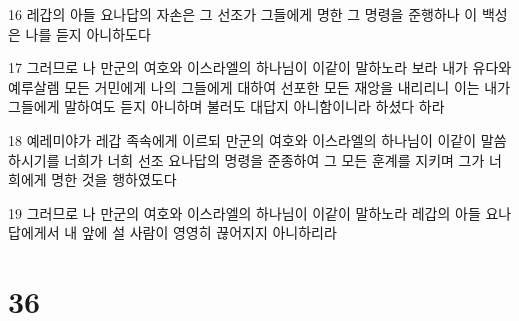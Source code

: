 \par 16 레갑의 아들 요나답의 자손은 그 선조가 그들에게 명한 그 명령을 준행하나 이 백성은 나를 듣지 아니하도다
\par 17 그러므로 나 만군의 여호와 이스라엘의 하나님이 이같이 말하노라 보라 내가 유다와 예루살렘 모든 거민에게 나의 그들에게 대하여 선포한 모든 재앙을 내리리니 이는 내가 그들에게 말하여도 듣지 아니하며 불러도 대답지 아니함이니라 하셨다 하라
\par 18 예레미야가 레갑 족속에게 이르되 만군의 여호와 이스라엘의 하나님이 이같이 말씀하시기를 너희가 너희 선조 요나답의 명령을 준종하여 그 모든 훈계를 지키며 그가 너희에게 명한 것을 행하였도다
\par 19 그러므로 나 만군의 여호와 이스라엘의 하나님이 이같이 말하노라 레갑의 아들 요나답에게서 내 앞에 설 사람이 영영히 끊어지지 아니하리라

\chapter{36}

